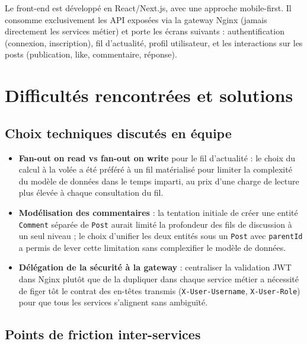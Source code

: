 \documentclass{cesi}
\begin{document}
Le front-end est développé en React/Next.js, avec une approche mobile-first. Il
consomme exclusivement les API exposées via la gateway Nginx (jamais directement
les services métier) et porte les écrans suivants : authentification (connexion,
inscription), fil d'actualité, profil utilisateur, et les interactions sur les
posts (publication, like, commentaire, réponse).

\newpage
\section{Difficultés rencontrées et solutions}

\subsection{Choix techniques discutés en équipe}

\begin{itemize}
  \item \textbf{Fan-out on read vs fan-out on write} pour le fil d'actualité : le
        choix du calcul à la volée a été préféré à un fil matérialisé pour limiter
        la complexité du modèle de données dans le temps imparti, au prix d'une
        charge de lecture plus élevée à chaque consultation du fil.
  \item \textbf{Modélisation des commentaires} : la tentation initiale de créer une
        entité \texttt{Comment} séparée de \texttt{Post} aurait limité la profondeur
        des fils de discussion à un seul niveau ; le choix d'unifier les deux entités
        sous un \texttt{Post} avec \texttt{parentId} a permis de lever cette
        limitation sans complexifier le modèle de données.
  \item \textbf{Délégation de la sécurité à la gateway} : centraliser la validation
        JWT dans Nginx plutôt que de la dupliquer dans chaque service métier a
        nécessité de figer tôt le contrat des en-têtes transmis
        (\texttt{X-User-Username}, \texttt{X-User-Role}) pour que tous les services
        s'alignent sans ambiguïté.
\end{itemize}

\subsection{Points de friction inter-services}
\end{document}
